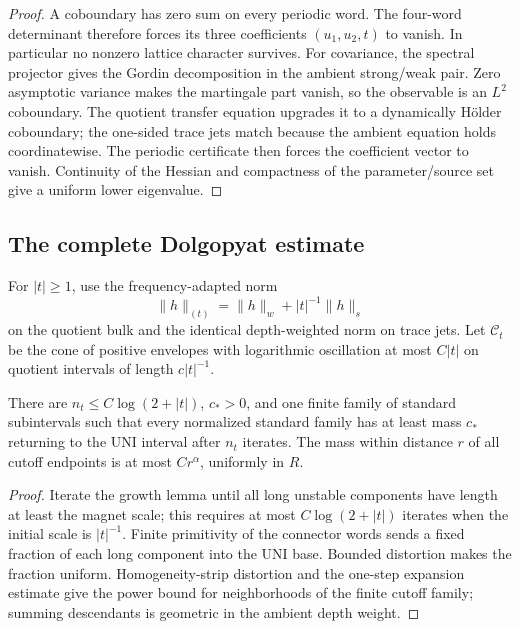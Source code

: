 \begin{proof}
A coboundary has zero sum on every periodic word.  The four-word determinant
therefore forces its three coefficients \((u_1,u_2,t)\) to vanish.  In
particular no nonzero lattice character survives.  For covariance, the
spectral projector gives the Gordin decomposition in the ambient strong/weak
pair.  Zero asymptotic variance makes the martingale part vanish, so the
observable is an \(L^2\) coboundary.  The quotient transfer equation upgrades
it to a dynamically Hölder coboundary; the one-sided trace jets match because
the ambient equation holds coordinatewise.  The periodic certificate then
forces the coefficient vector to vanish.  Continuity of the Hessian and
compactness of the parameter/source set give a uniform lower eigenvalue.
\end{proof}

\subsection{The complete Dolgopyat estimate}

For \(|t|\ge1\), use the frequency-adapted norm
\[
\|h\|_{(t)}=\|h\|_w+|t|^{-1}\|h\|_s
\]
on the quotient bulk and the identical depth-weighted norm on trace jets.
Let \(\mathscr C_t\) be the cone of positive envelopes with logarithmic
oscillation at most \(C|t|\) on quotient intervals of length
\(c|t|^{-1}\).

\begin{lemma}
\label{lem:r6-a2-return}
There are \(n_t\le C\log(2+|t|)\), \(c_*>0\), and one finite family of
standard subintervals such that every normalized standard family has at least
mass \(c_*\) returning to the UNI interval after \(n_t\) iterates.  The mass
within distance \(r\) of all cutoff endpoints is at most \(Cr^\alpha\),
uniformly in \(R\).
\end{lemma}

\begin{proof}
Iterate the growth lemma until all long unstable components have length at
least the magnet scale; this requires at most \(C\log(2+|t|)\) iterates when
the initial scale is \(|t|^{-1}\).  Finite primitivity of the connector words
sends a fixed fraction of each long component into the UNI base.  Bounded
distortion makes the fraction uniform.  Homogeneity-strip distortion and the
one-step expansion estimate give the power bound for neighborhoods of the
finite cutoff family; summing descendants is geometric in the ambient depth
weight.
\end{proof}

